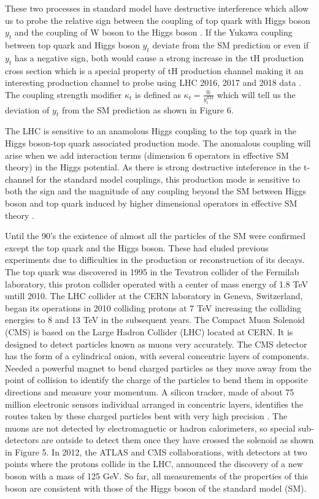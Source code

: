 \documentclass[final,3p]{CSP}
\begin{document}
 These two processes in standard model have destructive interference which allow us to 
probe the relative sign between 
the coupling of top quark with Higgs boson $y_t$ and the coupling of W boson to the Higgs 
boson \cite{choudhury2019search}. If the Yukawa coupling between top quark and Higgs boson $y_t$ deviate from the SM 
prediction or even if $y_t$ has a negative sign, both would cause a strong increase in the tH 
production cross section which is a special property of tH production channel making it an 
interesting production channel to probe using LHC 2016, 2017 and 2018 data \cite{farina2013lifting}. The coupling 
strength modifier $\kappa_t$ is defined as $\kappa_t = \frac{y_t}{y^{SM}_t}$ which will tell 
us the deviation of $y_t$ from the SM prediction as shown in Figure 6. 

The LHC is sensitive to an anamolous Higgs coupling to the top quark in the Higgs boson-top 
quark associated production mode. 
The anomalous coupling will arise when we add interaction terms (dimension 6 operators in 
effective SM theory) in the Higgs 
potential. As there is strong destructive inteference in the t-channel for the standard model 
couplings, this production mode 
is sensitive to both the sign and the magnitude of any coupling beyond the SM between Higgs 
boson and top quark induced by 
higher dimensional operators in effective SM theory \cite{sirunyan2019search}.

Until the 90's the existence of almost all the particles of the SM were confirmed except the top quark and the Higgs boson. 
These had eluded previous experiments due to difficulties in the production or reconstruction of its decays. The top quark was 
discovered in 1995 in the Tevatron collider of the Fermilab laboratory, this proton collider operated with a center of mass 
energy of 1.8 TeV untill 2010. The LHC collider at the CERN laboratory in Geneva, Switzerland, began its operations in 2010 
colliding protons at 7 TeV increasing the colliding energies to 8 and 13 TeV in the subsequent years. The Compact Muon Solenoid (CMS) is based on the Large Hadron Collider (LHC) located at CERN. It is designed to detect particles known as muons very accurately. The CMS detector has the form of a cylindrical onion, with several concentric layers of components. Needed a powerful magnet to bend charged particles as they move away from the point of collision to identify the charge of the particles to bend them in opposite directions and measure your momentum. A silicon tracker, made of about 75 
million electronic sensors individual arranged in concentric layers, identifies the routes taken by these charged particles bent with very high precision \cite{Chatrchyan:2008aa}. The muons are not detected by electromagnetic or hadron calorimeters, so special sub-detectors are outside to detect them once they have crossed the solenoid as shown in Figure 5. In 2012, the ATLAS and CMS collaborations, with detectors at two points where the protons collide in the LHC, announced the discovery of a new boson with a mass of 125 GeV. So far, all measurements of the properties of this boson are consistent with those of the Higgs boson of the standard model (SM).
\end{document}
